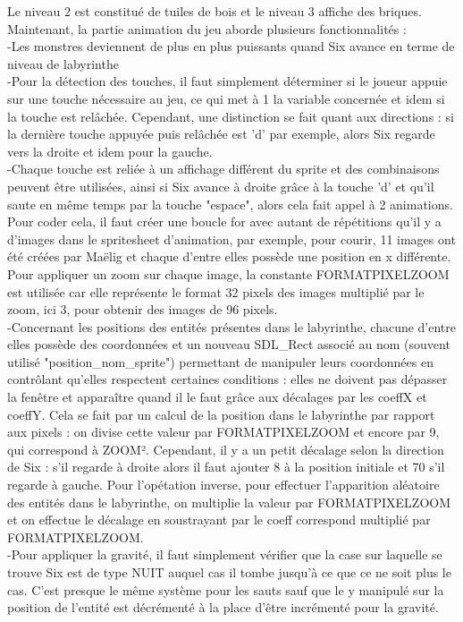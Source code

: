 \documentclass[10pt]{article}
\begin{document}
\begin{center}
   Le niveau 2 est constitué de tuiles de bois et le niveau 3 affiche des briques. \\Maintenant, la partie animation du jeu aborde plusieurs fonctionnalités :\\
   -Les monstres deviennent de plus en plus puissants quand Six avance en terme de niveau de labyrinthe\\
   -Pour la détection des touches, il faut simplement déterminer si le joueur appuie sur une touche nécessaire au jeu, ce qui met à 1 la variable concernée et idem si la touche est relâchée. Cependant, une distinction se fait quant aux directions : si la dernière touche appuyée puis relâchée est 'd' par exemple, alors Six regarde vers la droite et idem pour la gauche.\\
   -Chaque touche est reliée à un affichage différent du sprite et des combinaisons peuvent être utilisées, ainsi si Six avance à droite grâce à la touche 'd' et qu'il saute en même temps par la touche "espace", alors cela fait appel à 2 animations. Pour coder cela, il faut créer une boucle for avec autant de répétitions qu'il y a d'images dans le spritesheet d'animation, par exemple, pour courir, 11 images ont été créées par Maëlig et chaque d'entre elles possède une position en x différente. Pour appliquer un zoom sur chaque image, la constante FORMATPIXELZOOM est utilisée car elle représente le format 32 pixels des images multiplié par le zoom, ici 3, pour obtenir des images de 96 pixels. \\
   -Concernant les positions des entités présentes dans le labyrinthe, chacune d'entre elles possède des coordonnées et un nouveau SDL\_Rect associé au nom (souvent utilisé "position\_nom\_sprite") permettant de manipuler leurs coordonnées en contrôlant qu'elles respectent certaines conditions : elles ne doivent pas dépasser la fenêtre et apparaître quand il le faut grâce aux décalages par les coeffX et coeffY. Cela se fait par un calcul de la position dans le labyrinthe par rapport aux pixels : on divise cette valeur par FORMATPIXELZOOM et encore par 9, qui correspond à ZOOM². Cependant, il y a un petit décalage selon la direction de Six : s'il regarde à droite alors il faut ajouter 8 à la position initiale et 70 s'il regarde à gauche. Pour l'opétation inverse, pour effectuer l'apparition aléatoire des entités dans le labyrinthe, on multiplie la valeur par FORMATPIXELZOOM et on effectue le décalage en soustrayant par le coeff correspond multiplié par FORMATPIXELZOOM.\\
   -Pour appliquer la gravité, il faut simplement vérifier que la case sur laquelle se trouve Six est de type NUIT auquel cas il tombe jusqu'à ce que ce ne soit plus le cas. C'est presque le même système pour les sauts sauf que le y manipulé sur la position de l'entité est décrémenté à la place d'être incrémenté pour la gravité.\\

\end{center}
\end{document}
